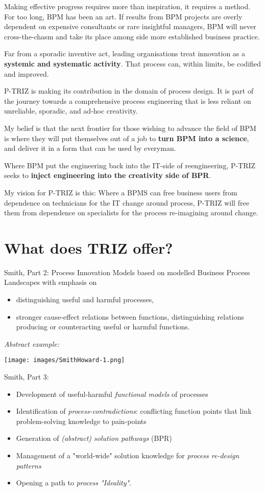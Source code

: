 \documentclass[11pt,a4paper]{article}
\begin{document}
Making effective progress requires more than inspiration, it requires a
method. For too long, BPM has been an art. If results from BPM projects are
overly dependent on expensive consultants or rare insightful managers, BPM
will never cross-the-chasm and take its place among side more established
business practice.

Far from a sporadic inventive act, leading organisations treat innovation as a
\textbf{systemic and systematic activity}. That process can, within limits, be
codified and improved.

P-TRIZ is making its contribution in the domain of process design. It is part
of the journey towards a comprehensive process engineering that is less
reliant on unreliable, sporadic, and ad-hoc creativity.

My belief is that the next frontier for those wishing to advance the field of
BPM is where they will put themselves out of a job to \textbf{turn BPM into a
  science}, and deliver it in a form that can be used by everyman.

Where BPM put the engineering back into the IT-side of reengineering, P-TRIZ
seeks to \textbf{inject engineering into the creativity side of BPR}.

My vision for P-TRIZ is this: Where a BPMS can free business users from
dependence on technicians for the IT change around process, P-TRIZ will free
them from dependence on specialists for the process re-imagining around
change.

\section{What does TRIZ offer?}

Smith, Part 2: Process Innovation Models based on modelled Business Process
Landscapes with emphasis on
\begin{itemize}
\item distinguishing useful and harmful processes,
\item stronger cause-effect relations between functions, distinguishing
  relations producing or counteracting useful or harmful functions.
\end{itemize}
\emph{Abstract example:} 
\begin{center}
  \texttt{[image: images/SmithHoward-1.png]}
\end{center}
Smith, Part 3: 
\begin{itemize}
\item Development of useful-harmful \emph{functional models} of processes
\item Identification of \emph{process-contradictions}: conflicting function
  points that link problem-solving knowledge to pain-points
\item Generation of \emph{(abstract) solution pathways} (BPR) 
\item Management of a "world-wide" solution knowledge for \emph{process
  re-design patterns}
\item Opening a path to \emph{process "Ideality"}.
\end{itemize}
\end{document}

